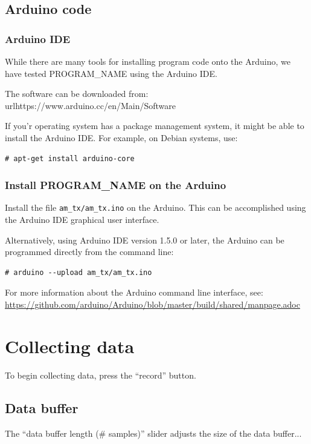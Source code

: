 \documentclass[11pt,letterpaper,article,oneside]{memoir}
\newcommand{\name}{PROGRAM\_NAME}
\begin{document}
\subsection{Arduino code}

\subsubsection{Arduino IDE}
While there are many tools for installing program code onto the Arduino, we have
tested \name{} using the Arduino IDE.

The software can be downloaded from:
url{https://www.arduino.cc/en/Main/Software}

If you'r operating system has a package management system, it might be able
to install the Arduino IDE. For example, on Debian systems, use:
\begin{verbatim}
# apt-get install arduino-core
\end{verbatim}

\subsubsection{Install \name{} on the Arduino}
\label{sec:installarduinocode}

Install the file \verb|am_tx/am_tx.ino| on the Arduino.
This can be accomplished using the Arduino IDE graphical user interface.

Alternatively, using Arduino IDE version 1.5.0 or later,
the Arduino can be programmed directly from the command line:

\begin{verbatim}
# arduino --upload am_tx/am_tx.ino
\end{verbatim}

For more information about the Arduino command line interface, see:
\url{https://github.com/arduino/Arduino/blob/master/build/shared/manpage.adoc}

\section{Collecting data}

To begin collecting data, press the ``record'' button.


\subsection{Data buffer}

The ``data buffer length (\# samples)'' slider adjusts the size of the data
buffer... 
\end{document}
